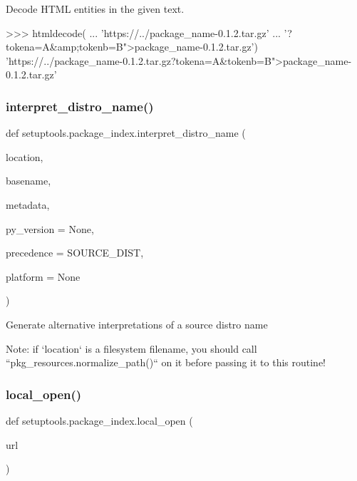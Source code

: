 \begin{DoxyVerb}Decode HTML entities in the given text.

>>> htmldecode(
...     'https://../package_name-0.1.2.tar.gz'
...     '?tokena=A&amp;tokenb=B">package_name-0.1.2.tar.gz')
'https://../package_name-0.1.2.tar.gz?tokena=A&tokenb=B">package_name-0.1.2.tar.gz'
\end{DoxyVerb}
 \mbox{\label{namespacesetuptools_1_1package__index_a1efdd05a9931992ea9882621aba5d104}} 
\subsubsection{\texorpdfstring{interpret\+\_\+distro\+\_\+name()}{interpret\_distro\_name()}}
{\footnotesize\ttfamily def setuptools.\+package\+\_\+index.\+interpret\+\_\+distro\+\_\+name (\begin{DoxyParamCaption}\item[{}]{location,  }\item[{}]{basename,  }\item[{}]{metadata,  }\item[{}]{py\+\_\+version = {\ttfamily None},  }\item[{}]{precedence = {\ttfamily SOURCE\+\_\+DIST},  }\item[{}]{platform = {\ttfamily None} }\end{DoxyParamCaption})}

\begin{DoxyVerb}Generate alternative interpretations of a source distro name

Note: if `location` is a filesystem filename, you should call
``pkg_resources.normalize_path()`` on it before passing it to this
routine!
\end{DoxyVerb}
 \mbox{\label{namespacesetuptools_1_1package__index_a54dcf838d95efdcc84ef4720d32be7a7}} 
\subsubsection{\texorpdfstring{local\+\_\+open()}{local\_open()}}
{\footnotesize\ttfamily def setuptools.\+package\+\_\+index.\+local\+\_\+open (\begin{DoxyParamCaption}\item[{}]{url }\end{DoxyParamCaption})}


